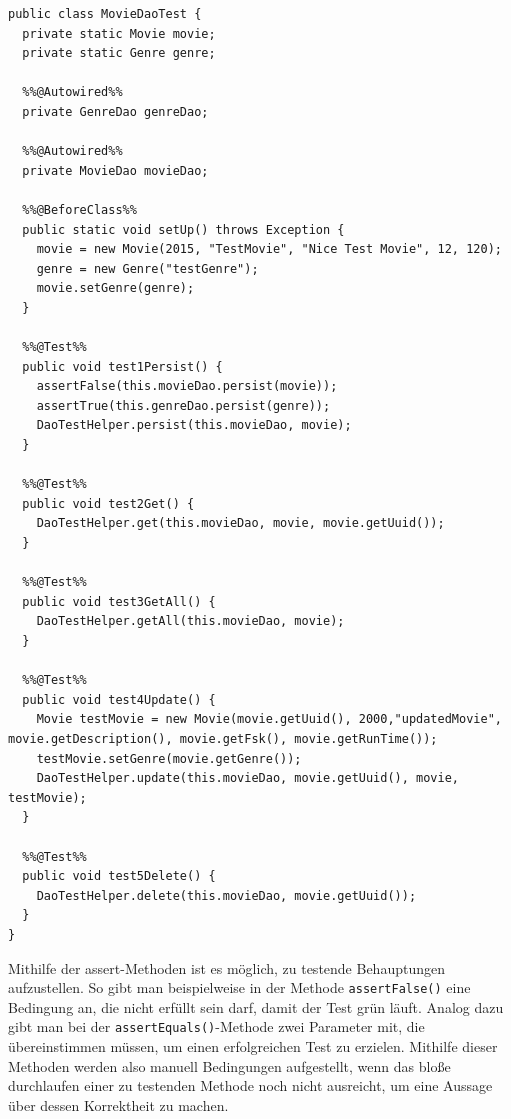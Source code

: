 \begin{lstlisting}
public class MovieDaoTest {
  private static Movie movie;
  private static Genre genre;

  %%@Autowired%%
  private GenreDao genreDao;
	
  %%@Autowired%%
  private MovieDao movieDao;

  %%@BeforeClass%%
  public static void setUp() throws Exception {
    movie = new Movie(2015, "TestMovie", "Nice Test Movie", 12, 120);
    genre = new Genre("testGenre");
    movie.setGenre(genre);
  }
	
  %%@Test%%
  public void test1Persist() {
    assertFalse(this.movieDao.persist(movie));
    assertTrue(this.genreDao.persist(genre));
    DaoTestHelper.persist(this.movieDao, movie);
  }
	
  %%@Test%%
  public void test2Get() {
    DaoTestHelper.get(this.movieDao, movie, movie.getUuid());
  }
	
  %%@Test%%
  public void test3GetAll() {
    DaoTestHelper.getAll(this.movieDao, movie);
  }
	
  %%@Test%%
  public void test4Update() {
    Movie testMovie = new Movie(movie.getUuid(), 2000,"updatedMovie", movie.getDescription(), movie.getFsk(), movie.getRunTime());
    testMovie.setGenre(movie.getGenre());
    DaoTestHelper.update(this.movieDao, movie.getUuid(), movie, testMovie);
  }
	
  %%@Test%%
  public void test5Delete() {
    DaoTestHelper.delete(this.movieDao, movie.getUuid());
  }
}
	\end{lstlisting}

	Mithilfe der assert-Methoden ist es möglich, zu testende Behauptungen aufzustellen. So gibt man beispielweise in der Methode \texttt{assertFalse()} eine Bedingung an, die nicht erfüllt sein darf, damit der Test grün läuft. Analog dazu gibt man bei der \texttt{assertEquals()}-Methode zwei Parameter mit, die übereinstimmen müssen, um einen erfolgreichen Test zu erzielen.
	Mithilfe dieser Methoden werden also manuell Bedingungen aufgestellt, wenn das bloße durchlaufen einer zu testenden Methode noch nicht ausreicht, um eine Aussage über dessen Korrektheit zu machen.
	
